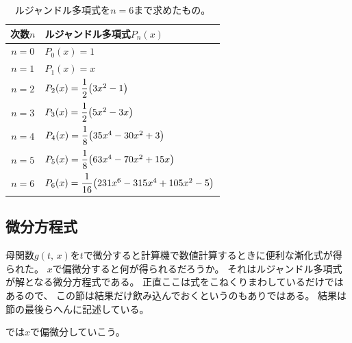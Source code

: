 \documentclass[../master.tex]{subfiles}
\begin{document}
\begin{table}[htb]
	\centering
	\caption{ルジャンドル多項式を\(n=6\)まで求めたもの。}
	\begin{tabular}{cl}
		\hline
		次数\(n\) & ルジャンドル多項式\(P_n(x)\)                                   \\
		\hline \hline
		\(n=0\) & \(P_0(x)= 1\)                                         \\
		\(n=1\) & \(P_1(x)= x\)                                         \\
		\(n=2\) & \(P_2(x)= \dfrac{1}{2}\qty(3x^2-1)\)
		\rule[-4.5mm]{0mm}{9mm}                                         \\
		\(n=3\) & \(P_3(x)= \dfrac{1}{2}\qty(5x^2-3x)\)
		\rule[-4.5mm]{0mm}{9mm}                                         \\
		\(n=4\) & \(P_4(x)= \dfrac{1}{8}\qty(35x^4-30x^2+3)\)
		\rule[-4.5mm]{0mm}{9mm}                                         \\
		\(n=5\) & \(P_5(x)= \dfrac{1}{8}\qty(63x^4-70x^2+15x)\)
		\rule[-4.5mm]{0mm}{9mm}                                         \\
		\(n=6\) & \(P_6(x)= \dfrac{1}{16}\qty(231x^6-315x^4+105x^2-5)\)
		\rule[-4.5mm]{0mm}{9mm}                                         \\
		\hline
	\end{tabular}
\end{table}

\subsection{微分方程式}
母関数\(g(t,\,x)\)を\(t\)で微分すると計算機で数値計算するときに便利な漸化式が得られた。
\(x\)で偏微分すると何が得られるだろうか。
それはルジャンドル多項式が解となる微分方程式である。
正直ここは式をこねくりまわしているだけではあるので、
この節は結果だけ飲み込んでおくというのもありではある。
結果は節の最後らへんに記述している。

では\(x\)で偏微分していこう。
\end{document}
